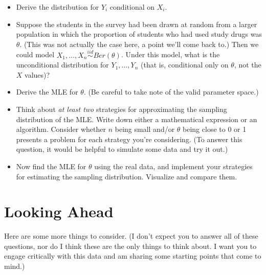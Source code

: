 \documentclass[11pt, oneside]{article}   	%
\begin{document}
\begin{itemize}
\item Derive the distribution for $Y_i$ conditional on $X_i$.
\item Suppose the students in the survey had been drawn at random from a larger population in which the proportion of students who had used study drugs was $\theta$. (This was not actually the case here, a point we'll come back to.) Then we could model $X_1, \ldots, X_n \stackrel{iid}{\sim} Ber(\theta)$. Under this model, what is the unconditional distribution for $Y_1, \ldots, Y_n$ (that is, conditional only on $\theta$, not the $X$ values)?
\item Derive the MLE for $\theta$. (Be careful to take note of the valid parameter space.)
\item Think about {\em at least two} strategies for approximating the sampling distribution of the MLE. Write down either a mathematical expression or an algorithm. Consider whether $n$ being small and/or $\theta$ being close to 0 or 1 presents a problem for each strategy you're considering. (To answer this question, it would be helpful to simulate some data and try it out.)
\item Now find the MLE for $\theta$ using the real data, and implement your strategies for estimating the sampling distribution. Visualize and compare them.
\end{itemize}

\section{Looking Ahead}

Here are some more things to consider. (I don't expect you to answer all of these questions, nor do I think these are the only things to think about. I want you to engage critically with this data and am sharing some starting points that come to mind.)
\end{document}
